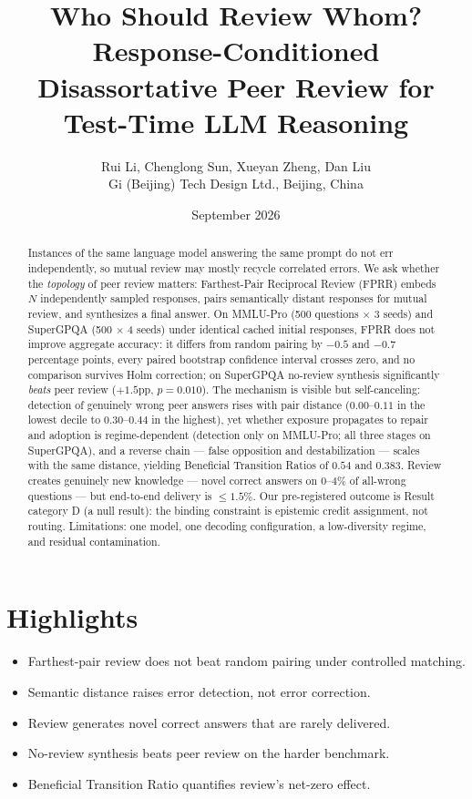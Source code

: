 \documentclass[11pt]{article}
\title{Who Should Review Whom?\\Response-Conditioned Disassortative Peer Review for Test-Time LLM Reasoning}
\author{Rui Li, Chenglong Sun, Xueyan Zheng, Dan Liu\\[0.3em]Gi (Beijing) Tech Design Ltd., Beijing, China}
\date{September 2026}
\begin{document}
\maketitle
\pagestyle{myheadings}


\section*{Highlights}
\begin{itemize}
\item Farthest-pair review does not beat random pairing under controlled matching.
\item Semantic distance raises error detection, not error correction.
\item Review generates novel correct answers that are rarely delivered.
\item No-review synthesis beats peer review on the harder benchmark.
\item Beneficial Transition Ratio quantifies review's net-zero effect.
\end{itemize}

\begin{abstract}
Instances of the same language model answering the same prompt do not err independently, so mutual review may mostly recycle correlated errors. We ask whether the \emph{topology} of peer review matters: Farthest-Pair Reciprocal Review (FPRR) embeds $N$ independently sampled responses, pairs semantically distant responses for mutual review, and synthesizes a final answer. On MMLU-Pro (500 questions $\times$ 3 seeds) and SuperGPQA (500 $\times$ 4 seeds) under identical cached initial responses, FPRR does not improve aggregate accuracy: it differs from random pairing by $-0.5$ and $-0.7$ percentage points, every paired bootstrap confidence interval crosses zero, and no comparison survives Holm correction; on SuperGPQA no-review synthesis significantly \emph{beats} peer review ($+1.5$pp, $p=0.010$). The mechanism is visible but self-canceling: detection of genuinely wrong peer answers rises with pair distance ($0.00$--$0.11$ in the lowest decile to $0.30$--$0.44$ in the highest), yet whether exposure propagates to repair and adoption is regime-dependent (detection only on MMLU-Pro; all three stages on SuperGPQA), and a reverse chain --- false opposition and destabilization --- scales with the same distance, yielding Beneficial Transition Ratios of $0.54$ and $0.383$. Review creates genuinely new knowledge --- novel correct answers on $0$--$4\%$ of all-wrong questions --- but end-to-end delivery is $\le 1.5\%$. Our pre-registered outcome is Result category D (a null result): the binding constraint is epistemic credit assignment, not routing. Limitations: one model, one decoding configuration, a low-diversity regime, and residual contamination.
\end{abstract}
\end{document}
